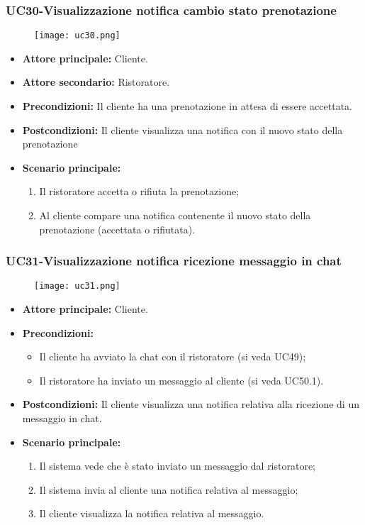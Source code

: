 \pagebreak
\subsubsection{UC30-Visualizzazione notifica cambio stato prenotazione}
\begin{figure}[h] \texttt{[image: uc30.png]} \end{figure}
\begin{itemize}
\item \textbf{Attore principale:} Cliente.
\item \textbf{Attore secondario:} Ristoratore.
\item \textbf{Precondizioni:} Il cliente ha una prenotazione in attesa di essere accettata.
\item \textbf{Postcondizioni:} Il cliente visualizza una notifica con il nuovo stato della prenotazione
\item \textbf{Scenario principale:}
\begin{enumerate}
    \item Il ristoratore accetta o rifiuta la prenotazione;
    \item Al cliente compare una notifica contenente il nuovo stato della prenotazione (accettata o rifiutata).
\end{enumerate}
\end{itemize}

\subsubsection{UC31-Visualizzazione notifica ricezione messaggio in chat}
\begin{figure}[h] \texttt{[image: uc31.png]} \end{figure}
\begin{itemize}
\item \textbf{Attore principale:} Cliente.
\item \textbf{Precondizioni:}
\begin{itemize}
    \item Il cliente ha avviato la chat con il ristoratore (si veda UC49);
    \item Il ristoratore ha inviato un messaggio al cliente (si veda UC50.1).
\end{itemize}
\item \textbf{Postcondizioni:} Il cliente visualizza una notifica relativa alla ricezione di un messaggio in chat.
\item \textbf{Scenario principale:}
\begin{enumerate}
    \item Il sistema vede che è stato inviato un messaggio dal ristoratore;
    \item Il sistema invia al cliente una notifica relativa al messaggio;
    \item Il cliente visualizza la notifica relativa al messaggio.
\end{enumerate}
\end{itemize}

